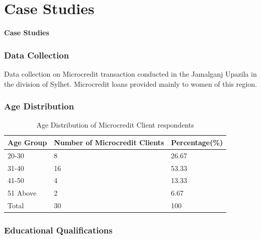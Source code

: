 \documentclass{beamer}
\begin{document}
\section{Case Studies}
\begin{frame}
\begin{center}
{\LARGE \textbf{Case Studies}}
\end{center}
\end{frame}

\begin{frame}
\frametitle{Data Collection}
Data collection on Microcredit transaction conducted in the Jamalganj Upazila in the division of Sylhet. Microcredit loans provided mainly to women of this region.
\end{frame}

\begin{frame}
\frametitle{Age Distribution}

\begin{table}[!h]
\centering
\begin{tabular}{|l|l|l|}
\hline
\textbf{Age Group} & \textbf{Number of Microcredit Clients} & \textbf{Percentage(\%)}\\
\hline
20-30 & 8 & 26.67\\
31-40 & 16 & 53.33\\
41-50 & 4 & 13.33\\
51 Above & 2 & 6.67\\
\hline
Total & 30 & 100\\
\hline
\end{tabular}
\caption{Age Distribution of Microcredit Client respondents}
\end{table}

\end{frame}

\begin{frame}
\frametitle{Educational Qualifications}

\begin{table}[!h]
\centering
{}
\caption{Educational Qualifications Distribution of Microcredit Client respondents}
\end{table}

\end{frame}
\end{document}
